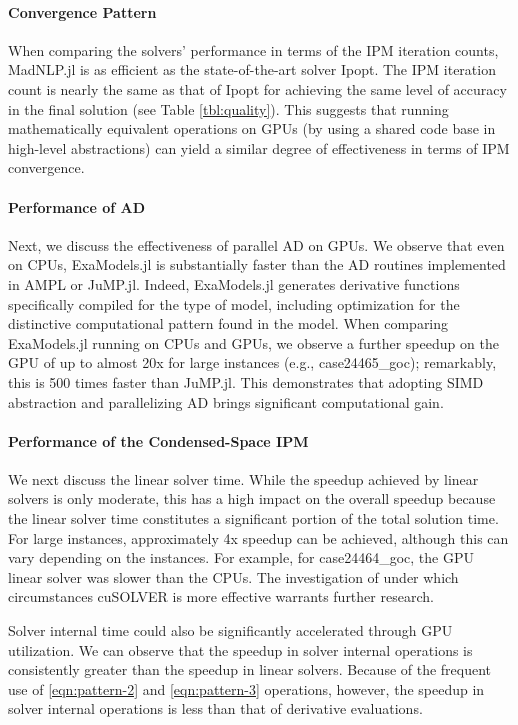 \documentclass{IEEEtran4PSCC} %
\begin{document}
\paragraph*{Convergence Pattern}
When comparing the solvers' performance in terms of the
IPM iteration counts, MadNLP.jl is as
efficient as the state-of-the-art solver Ipopt. The IPM iteration
count is nearly the same as that of Ipopt for achieving the same level
of accuracy in the final solution (see Table \ref{tbl:quality}). This
suggests that running mathematically equivalent operations on GPUs (by
using a shared code base in high-level abstractions) can yield a similar
degree of effectiveness in terms of IPM convergence.

\paragraph*{Performance of AD}
Next, we discuss the effectiveness of parallel AD on GPUs. We observe
that even on CPUs, ExaModels.jl is substantially faster than the AD
routines implemented in AMPL or JuMP.jl. Indeed, ExaModels.jl generates
derivative functions specifically compiled for the type of model,
including optimization for the distinctive computational pattern found
in the model. When comparing ExaModels.jl running on CPUs and GPUs, we
observe a further speedup on the GPU of up to almost 20x for large
instances (e.g., case24465\_goc); remarkably, this is 500 times faster
than JuMP.jl. This demonstrates that adopting SIMD abstraction and
parallelizing AD brings significant computational gain. 

\paragraph*{Performance of the Condensed-Space IPM}
We next discuss the linear solver time. While the speedup achieved by
linear solvers is only moderate, this has a high impact on the overall
speedup because the linear solver time constitutes a significant portion of
the total solution time. For large instances, approximately 4x speedup
can be achieved, although this can vary depending on the instances. For
example, for case24464\_goc, the GPU linear solver was slower than the
CPUs. The investigation of under which circumstances cuSOLVER is
more effective warrants further research.

Solver internal time could also be significantly accelerated through
GPU utilization. We can observe that the speedup in solver internal
operations is consistently greater than the speedup in linear
solvers. Because of the frequent use of \ref{eqn:pattern-2} and
\ref{eqn:pattern-3} operations,  however, the speedup in solver internal
operations is less than that of derivative evaluations.
\end{document}
